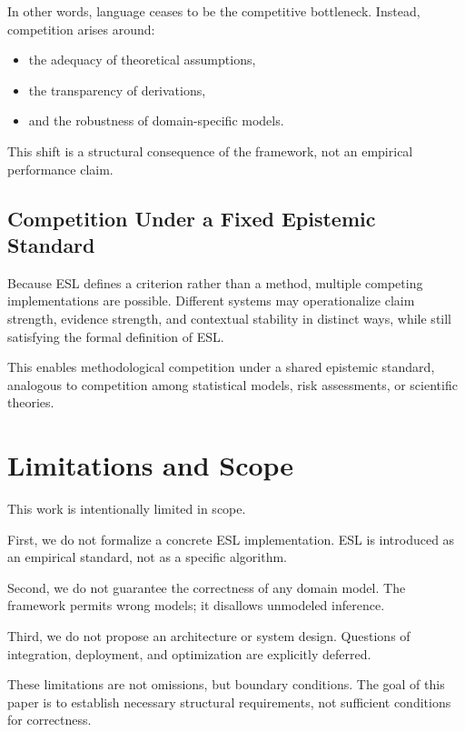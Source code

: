 \documentclass[11pt,a4paper]{article}
\begin{document}
In other words, language ceases to be the competitive bottleneck. Instead, competition arises around:
\begin{itemize}
    \item the adequacy of theoretical assumptions,
    \item the transparency of derivations,
    \item and the robustness of domain-specific models.
\end{itemize}

This shift is a structural consequence of the framework, not an empirical performance claim.

\subsection{Competition Under a Fixed Epistemic Standard}

Because ESL defines a criterion rather than a method, multiple competing implementations are possible. Different systems may operationalize claim strength, evidence strength, and contextual stability in distinct ways, while still satisfying the formal definition of ESL.

This enables methodological competition under a shared epistemic standard, analogous to competition among statistical models, risk assessments, or scientific theories.


\section{Limitations and Scope}

This work is intentionally limited in scope.

First, we do not formalize a concrete ESL implementation. ESL is introduced as an empirical standard, not as a specific algorithm.

Second, we do not guarantee the correctness of any domain model. The framework permits wrong models; it disallows unmodeled inference.

Third, we do not propose an architecture or system design. Questions of integration, deployment, and optimization are explicitly deferred.

These limitations are not omissions, but boundary conditions. The goal of this paper is to establish necessary structural requirements, not sufficient conditions for correctness.
\end{document}
